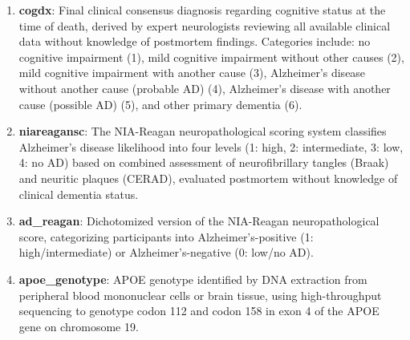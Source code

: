 \begin{enumerate}
    \item \textbf{cogdx}: Final clinical consensus diagnosis regarding cognitive status at the time of death, derived by expert neurologists reviewing all available clinical data without knowledge of postmortem findings. Categories include: no cognitive impairment (1), mild cognitive impairment without other causes (2), mild cognitive impairment with another cause (3), Alzheimer's disease without another cause (probable AD) (4), Alzheimer's disease with another cause (possible AD) (5), and other primary dementia (6).
    
    \item \textbf{niareagansc}: The NIA-Reagan neuropathological scoring system classifies Alzheimer's disease likelihood into four levels (1: high, 2: intermediate, 3: low, 4: no AD) based on combined assessment of neurofibrillary tangles (Braak) and neuritic plaques (CERAD), evaluated postmortem without knowledge of clinical dementia status.
    
    \item \textbf{ad\_reagan}: Dichotomized version of the NIA-Reagan neuropathological score, categorizing participants into Alzheimer's-positive (1: high/intermediate) or Alzheimer's-negative (0: low/no AD).
    
    \item \textbf{apoe\_genotype}: APOE genotype identified by DNA extraction from peripheral blood mononuclear cells or brain tissue, using high-throughput sequencing to genotype codon 112 and codon 158 in exon 4 of the APOE gene on chromosome 19.
\end{enumerate}